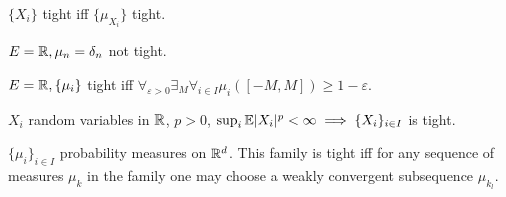 	\begin{definition}
		$\{X_i\}$ tight iff $\{\mu_{X_i}\}$ tight.
	\end{definition}
	
	\begin{example}
		$E=\mathbb{R}, \mu_n = \delta_n$ not tight.
	\end{example}
	
	\begin{remark}
		$E=\mathbb{R}, \{\mu_i\}$ tight iff $\forall_{\varepsilon > 0} \exists_M \forall_{i \in I} \mu_i([-M,M]) \geq 1-\varepsilon$.
	\end{remark}
	
	\begin{remark}
		$X_i$ random variables in $\mathbb{R}$, $p>0$, $\sup_i \mathbb{E} |X_i|^p < \infty \implies \{X_i\}_{i \in I}$ is tight.
	\end{remark}
	
	\begin{theorem}[Prokhorov]
		$\{\mu_i\}_{i \in I}$ probability measures on $\mathbb{R}^d$. This family is tight iff for any sequence of measures $\mu_k$ in the family one may choose a weakly convergent subsequence $\mu_{k_l}$.
	\end{theorem}




















 
 
